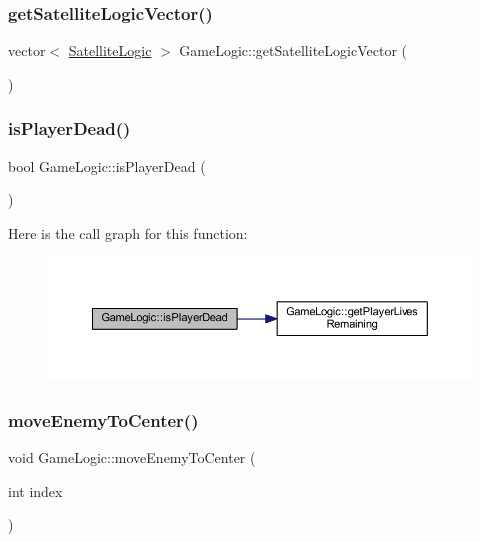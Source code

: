 \subsubsection{\texorpdfstring{get\+Satellite\+Logic\+Vector()}{getSatelliteLogicVector()}}
{\footnotesize\ttfamily vector$<$ \hyperlink{class_satellite_logic}{Satellite\+Logic} $>$ Game\+Logic\+::get\+Satellite\+Logic\+Vector (\begin{DoxyParamCaption}{ }\end{DoxyParamCaption})}

\mbox{\label{class_game_logic_a743d03f2c6dab3786addba9b2bc1e5dc}} 
\subsubsection{\texorpdfstring{is\+Player\+Dead()}{isPlayerDead()}}
{\footnotesize\ttfamily bool Game\+Logic\+::is\+Player\+Dead (\begin{DoxyParamCaption}{ }\end{DoxyParamCaption})}

Here is the call graph for this function\+:\nopagebreak
\begin{figure}[H]
\begin{center}
\leavevmode
\includegraphics[width=350pt]{class_game_logic_a743d03f2c6dab3786addba9b2bc1e5dc_cgraph}
\end{center}
\end{figure}
\mbox{\label{class_game_logic_af355faaa66630a76a14ef0d7dc5adb54}} 
\subsubsection{\texorpdfstring{move\+Enemy\+To\+Center()}{moveEnemyToCenter()}}
{\footnotesize\ttfamily void Game\+Logic\+::move\+Enemy\+To\+Center (\begin{DoxyParamCaption}\item[{int}]{index }\end{DoxyParamCaption})}

